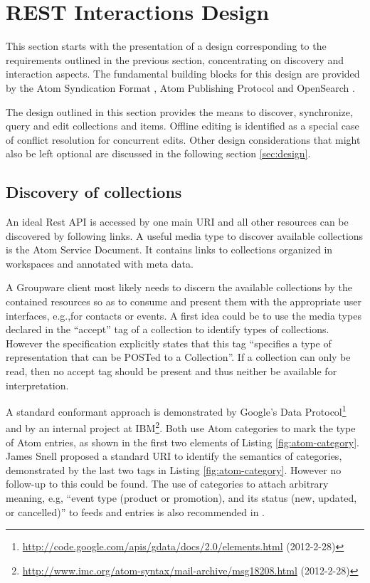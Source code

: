 \documentclass[11pt,a4paper,headsepline,twoside]{scrartcl}		%
\newcommand{\citeurl}[2]{\url{#1} (#2)}
\begin{document}
\section{REST Interactions Design}
\label{sec:interactions}

This section starts with the presentation of a design corresponding to the
requirements outlined in the previous section, concentrating on discovery and
interaction aspects. The fundamental building blocks for this design are
provided by the Atom Syndication Format \cite{RFC4287}, Atom Publishing Protocol
\cite{RFC5023} and OpenSearch \cite{Clinton}.

The design outlined in this section provides the means to discover, synchronize,
query and edit collections and items. Offline editing is identified as a special
case of conflict resolution for concurrent edits. Other design considerations
that might also be left optional are discussed in the following section
\ref{sec:design}.

\subsection{Discovery of collections}
\label{sec:disc-coll}

An ideal Rest API is accessed by one main URI and all other resources can be
discovered by following links. A useful media type to discover available
collections is the Atom Service Document\cite[sec. 8]{RFC5023}. It contains
links to collections organized in workspaces and annotated with meta data.

A Groupware client most likely needs to discern the available collections by the
contained resources so as to consume and present them with the appropriate user
interfaces, e.g.,for contacts or events. A first idea could be to use the
media types declared in the ``accept'' tag of a collection to identify types of
collections. However the specification explicitly states that this tag
``specifies a type of representation that can be POSTed to a
Collection''\cite[sec. 8.3.4]{RFC5023}. If a collection can only be read, then
no accept tag should be present and thus neither be available for
interpretation.

A standard conformant approach is demonstrated by Google's Data
Protocol\footnote{\citeurl{http://code.google.com/apis/gdata/docs/2.0/elements.html}{2012-2-28}}
and by an internal project at
IBM\footnote{\label{snellatomcategory}\citeurl{http://www.imc.org/atom-syntax/mail-archive/msg18208.html}{2012-2-28}}. Both
use Atom categories\cite[sec. 8.3.6]{RFC5023} to mark the type of Atom entries,
as shown in the first two elements of Listing \ref{fig:atom-category}. James
Snell proposed a standard URI to identify the semantics of
categories, demonstrated by the last two tags in
Listing \ref{fig:atom-category}. However no follow-up to this could be
found. The use of categories to attach arbitrary meaning, e.g, ``event type
(product or promotion), and its status (new, updated, or cancelled)'' to feeds
and entries is also recommended in \cite[p. 200]{Webber2010}.
\end{document}
